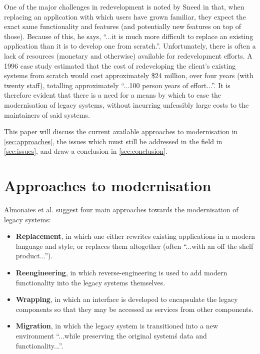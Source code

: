 \documentclass[12pt,journal,compsoc]{IEEEtran}
\begin{document}
One of the major challenges in redevelopment is noted by Sneed\cite{Sneed2011} in that, when replacing an application with which users have grown familiar, they expect the exact same functionality and features (and potentially new features on top of those). Because of this, he says, ``...it is much more difficult to replace an existing application than it is to develop one from scratch.''\cite{Sneed2011}. Unfortunately, there is often a lack of resources (monetary and otherwise) available for redevelopment efforts. A 1996 case study\cite{Duncan1996} estimated that the cost of redeveloping the client's existing systems from scratch would cost approximately \$24 million, over four years (with twenty staff), totalling approximately ``...100 person years of effort...''\cite{Duncan1996}. It is therefore evident that there is a need for a means by which to ease the modernisation of legacy systems, without incurring unfeasibly large costs to the maintainers of said systems.

This paper will discuss the current available approaches to modernisation in \autoref{sec:approaches}, the issues which must still be addressed in the field in \autoref{sec:issues}, and draw a conclusion  in \autoref{sec:conclusion}.

\section{Approaches to modernisation}
\label{sec:approaches}

Almonaies et al.\cite{Almonaies2010} suggest four main approaches towards the modernisation of legacy systems:
\begin{itemize}
\item\textbf{Replacement}, in which one either rewrites existing applications in a modern language and style, or replaces them altogether (often ``...with an off the shelf product...''\cite{Almonaies2010}).
\item\textbf{Reengineering}, in which reverse-engineering is used to add modern functionality into the legacy systems themselves.
\item\textbf{Wrapping}, in which an interface is developed to encapsulate the legacy components so that they may be accessed as services from other components.
\item\textbf{Migration}, in which the legacy system is transitioned into a new environment ``...while preserving the original system\'s data and functionality...''\cite{Almonaies2010}.
\end{itemize}
\end{document}
